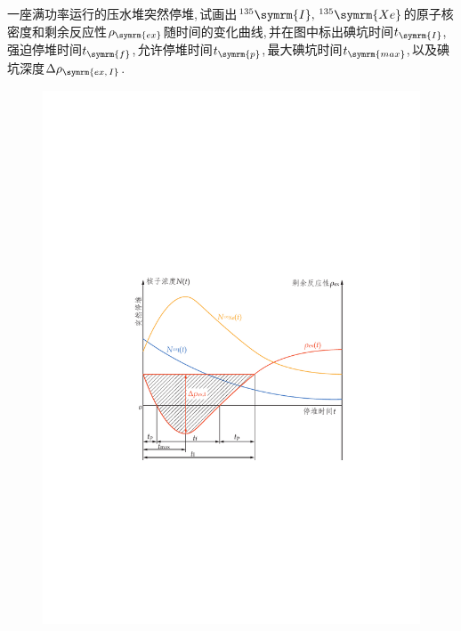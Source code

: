 \begin{exercise}
    一座满功率运行的压水堆突然停堆,\,试画出${}^{135}\symrm{I},\,{}^{135}\symrm{Xe}$的原子核密度和剩余反应性$\rho_{\symrm{ex}}$随时间的变化曲线,\,并在图中标出碘坑时间$t_{\symrm{I}}$,\,强迫停堆时间$t_{\symrm{f}}$,\,允许停堆时间$t_{\symrm{p}}$,\,最大碘坑时间$t_{\symrm{max}}$,\,以及碘坑深度$\Delta\rho_{\symrm{ex,\,I}}$.\,
    \begin{solution}
        \begin{figure}[H]
            \centering
            \includegraphics[scale=0.9]{figures/fig6.4.pdf}
        \end{figure}
    \end{solution}
\end{exercise}


